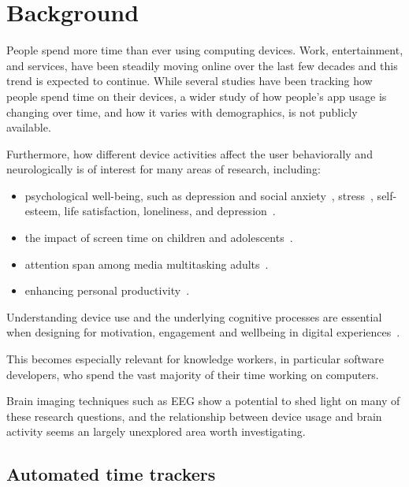 \section{Background}

People spend more time than ever using computing devices. Work, entertainment, and services, have been steadily moving online over the last few decades and this trend is expected to continue.
While several studies have been tracking how people spend time on their devices, a wider study of how people's app usage is changing over time, and how it varies with demographics, is not publicly available.

Furthermore, how different device activities affect the user behaviorally and neurologically is of interest for many areas of research, including:

\begin{itemize}
    \item psychological well-being, such as depression and social anxiety~\cite{selfhout_different_2009}\cite{shah_nonrecursive_2002}, stress~\cite{mark_stress_2014}, self-esteem, life satisfaction, loneliness, and depression~\cite{huang_time_2017}.
    \item the impact of screen time on children and adolescents~\cite{subrahmanyam_impact_2001}.
    \item attention span among media multitasking adults~\cite{mark_stress_2014}.
    \item enhancing personal productivity~\cite{kim_timeaware_2016}.
\end{itemize}

Understanding device use and the underlying cognitive processes are essential when designing for motivation, engagement and wellbeing in digital experiences~\cite{peters_designing_2018}.


This becomes especially relevant for knowledge workers, in particular software developers, who spend the vast majority of their time working on computers.

Brain imaging techniques such as EEG show a potential to shed light on many of these research questions, and the relationship between device usage and brain activity seems an largely unexplored area worth investigating.


\subsection{Automated time trackers}

